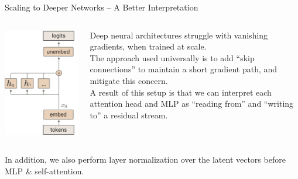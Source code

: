 \documentclass{beamer}
\begin{document}
\begin{frame}{Scaling to Deeper Networks -- A Better Interpretation}
	\begin{columns}
		\begin{column}{.35\textwidth}
			\begin{center}
				\includegraphics[width=\textwidth]{img/circuit-arch.png}
			\end{center}
		\end{column}
		\begin{column}{.5\textwidth}
			Deep neural architectures struggle with vanishing gradients, when trained at scale. \pause \newline \\

			The approach used universally is to add ``skip connections'' to maintain a short gradient path, and mitigate this concern. \pause \newline \\

			A result of this setup is that we can interpret each attention head and MLP as ``reading from'' and ``writing to'' a residual stream. \pause
		\end{column}
	\end{columns}
	\vspace{1em}
	In addition, we also perform layer normalization over the latent vectors before MLP \& self-attention.
\end{frame}
\end{document}

